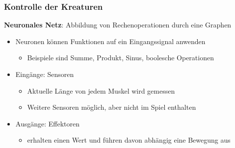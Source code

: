 \documentclass{beamer}
\begin{document}
\begin{frame}
	\frametitle{Kontrolle der Kreaturen}
	\textbf{Neuronales Netz}: Abbildung von Rechenoperationen durch eine Graphen\\ \pause
	\begin{itemize}
		\item Neuronen können Funktionen auf ein Eingangssignal anwenden \pause
		\begin{itemize}
			\item Beispiele sind Summe, Produkt, Sinus, boolesche Operationen \pause
		\end{itemize}
		\item Eingänge: Sensoren \pause
		\begin{itemize}
			\item Aktuelle Länge von jedem Muskel wird gemessen \pause
			\item Weitere Sensoren möglich, aber nicht im Spiel enthalten \pause
		\end{itemize}
		\item Ausgänge: Effektoren 
		\begin{itemize}
			\item erhalten einen Wert und führen davon abhängig eine Bewegung aus
		\end{itemize}
	\end{itemize}
\end{frame}
\end{document}
